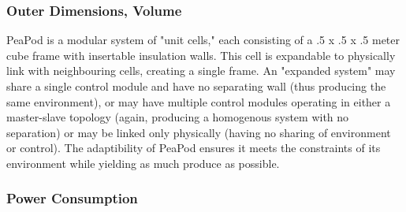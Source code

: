 \documentclass{report}
\begin{document}


\subsubsection{Outer Dimensions, Volume} 
\label{sec:constraints-volume}




PeaPod is a modular system of "unit cells," each consisting of a .5 x .5 x .5 meter cube frame with insertable insulation walls. This cell is expandable to physically link with neighbouring cells, creating a single frame. An "expanded system" may share a single control module and have no separating wall (thus producing the same environment), or may have multiple control modules operating in either a master-slave topology (again, producing a homogenous system with no separation) or may be linked only physically (having no sharing of environment or control). The adaptibility of PeaPod ensures it meets the constraints of its environment while yielding as much produce as possible.


\subsubsection{Power Consumption} 
\label{sec:constraints-power}

\end{document}
